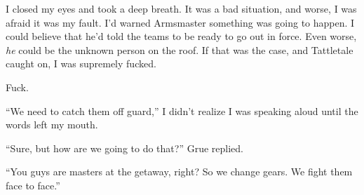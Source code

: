 I closed my eyes and took a deep breath. It was a bad situation, and worse, I was afraid it was my fault. I'd warned Armsmaster something was going to happen. I could believe that he'd told the teams to be ready to go out in force. Even worse, \emph{he} could be the unknown person on the roof. If that was the case, and Tattletale caught on, I was supremely fucked.



Fuck.



``We need to catch them off guard,'' I didn't realize I was speaking aloud until the words left my mouth.



``Sure, but how are we going to do that?'' Grue replied.



``You guys are masters at the getaway, right?  So we change gears.  We fight them face to face.''





